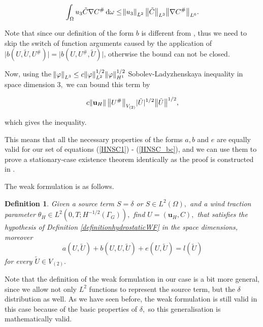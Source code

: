 \documentclass[11pt]{article}
\newtheorem{definition}{Definition}
\newcommand*\diff{\mathop{}\!\mathrm{d}}
\begin{document}
\begin{itemize}
\[ \int_\Omega u_3 \tilde{C} \nabla C^\# \diff \omega \leq \norm{u_3}_{L^2} \big \| \tilde{C} \big \| _{L^3} \big \| \nabla C^\# \big \| _{L^6}.\]

Note that since our definition of the form $b$ is different from \cite{temam2005some}, thus we need to skip the switch of function arguments caused by the application of $ \lvert b(U, \tilde{U}, U^\#) \rvert = \lvert b(U, U^\#, \tilde{U}) \rvert$, otherwise the bound can not be closed.

Now, using the $\norm{\varphi}_{L^3} \leq c \norm{\varphi}_{L^2}^{1/2} \norm{\varphi}_{H^1}^{1/2}$ Sobolev-Ladyzhenskaya inequality in space dimension $3,$ we can bound this term by

\[ c \norm{\mathbf{u}_H} \big \| U^\# \big \| _{V_{(2)}} \lvert \tilde{U} \rvert ^ {1/2} \big \| \tilde{U} \big \| ^{1/2} ,\]

which gives the inequality.

\end{itemize}

This means that all the necessary properties of the forms $a, b$ and $e$ are equally valid for our set of equations (\ref{HNSC1}) - (\ref{HNSC_bc}), and we can use them to prove a stationary-case existence theorem identically as the proof is constructed in \cite{temam2005some}. 

The weak formulation is as follows.



\begin{definition}
Given a source term $S = \delta$ or $S \in L^2(\Omega),$ and a wind traction parameter $\theta_H \in L^2(0,T;H^{-1/2}(\Gamma_G)),$ find $U = (\mathbf{u}_H, C),$ that satisfies the hypothesis of Definition \ref{definitionhydrostaticWF} in the space dimensions, moreover
\begin{equation} \label{FWSTAT} a(U, \tilde{U}) + b(U,U, \tilde{U}) + e(U, \tilde{U}) = l(\tilde{U}) \end{equation}
for every $\tilde{U} \in V_{(2)}.$
\end{definition}

Note that the definition of the weak formulation in our case is a bit more general, since we allow not only $L^2$ functions to represent the source term, but the $\delta$ distribution as well. As we have seen before, the weak formulation is still valid in this case because of the basic properties of $\delta,$ so this generalisation is mathematically valid. 
\end{document}
